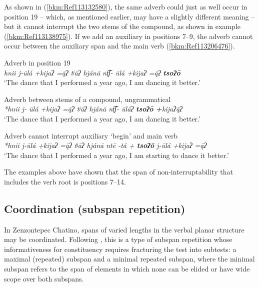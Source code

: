 \documentclass[output=paper]{langscibook}
\begin{document}
As shown in (\ref{bkm:Ref113132580}), the same adverb could just as well occur in position 19 -- which, as mentioned earlier, may have a slightly different meaning -- but it cannot interrupt the two stems of the compound, as shown in example (\ref{bkm:Ref113138975}). If we add an auxiliary in positions 7{}--9, the adverb cannot occur between the auxiliary span and the main verb (\ref{bkm:Ref113206476}).

\ea\label{bkm:Ref113132580}Adverb in position 19\\
\textit{hnii j-ūlá +kijaʔ =\={ą}ʔ tʲāʔ hjánā nt͡ʃ- ūlá +kijaʔ =\={ą}ʔ} \textbf{\textit{tsoʔō}} \\
`The dance that I performed a year ago, I am dancing it better.'\\
\z 

\ea\label{bkm:Ref113138975}Adverb between stems of a compound, ungrammatical \\
\textit{ *hnii j- ūlá +kijaʔ =\={ą}ʔ tʲāʔ hjánā nt͡ʃ- ūláʔ \textbf{tsoʔō} \textbf{+}kijaʔ\={ą}ʔ}\\
`The dance that I performed a year ago, I am dancing it better.'\\ 
\z

\ea\label{bkm:Ref113206476}Adverb cannot interrupt auxiliary `begin' and main verb\\
\textit{ *hnii j-ūlá +kijaʔ =\={ą}ʔ tʲāʔ hjánā ntē -tá + \textbf{tsoʔō} j-ūlá +kijaʔ =\={ą}ʔ}\\
`The dance that I performed a year ago, I am starting to dance it better.'\\
\z 

The examples above have shown that the span of non-interruptability that includes the verb root is positions 7{}--14.

\subsection{Coordination (subspan repetition)}
\label{bkm:Ref113137621}
In Zenzontepec Chatino, spans of varied lengths in the verbal planar structure may be coordinated. Following \citet[350]{Tallman2021}, this is a type of subspan repetition whose informativeness for constituency requires fracturing the test into subtests: a maximal (repeated) subspan and a minimal repeated subspan, where the minimal subspan refers to the span of elements in which none can be elided or have wide scope over both subspans.
\end{document}
